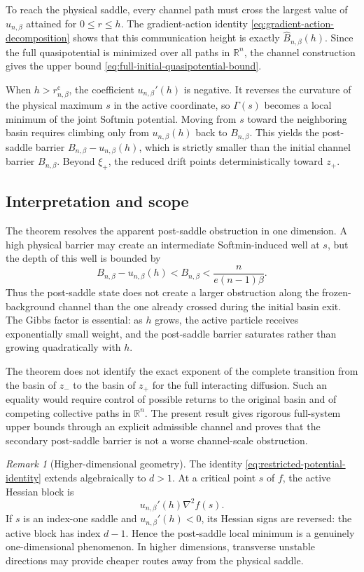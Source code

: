 \documentclass{article}
\theoremstyle{plain}
\theoremstyle{definition}
\theoremstyle{remark}
\newtheorem{remark}[theorem]{Remark}
\begin{document}
To reach the physical saddle, every channel path must cross the largest value of \(u_{n,\beta}\) attained for \(0\le r\le h\). The gradient-action identity \eqref{eq:gradient-action-decomposition} shows that this communication height is exactly
\(\widehat B_{n,\beta}(h)\). Since the full quasipotential is minimized over all paths in \(\mathbb R^n\), the channel construction gives the upper bound \eqref{eq:full-initial-quasipotential-bound}.

When \(h>r_{n,\beta}^{\mathrm c}\), the coefficient
\(u_{n,\beta}'(h)\) is negative. It reverses the curvature of the physical maximum \(s\) in the active coordinate, so \(\Gamma(s)\) becomes a local minimum of the joint Softmin potential. Moving from \(s\) toward the neighboring basin requires climbing only from
\(u_{n,\beta}(h)\) back to \(B_{n,\beta}\). This yields the post-saddle barrier
\(B_{n,\beta}-u_{n,\beta}(h)\), which is strictly smaller than the initial channel barrier \(B_{n,\beta}\). Beyond \(\xi_+\), the reduced drift points deterministically toward \(z_+\).

\subsection{Interpretation and scope}

The theorem resolves the apparent post-saddle obstruction in one dimension. A high physical barrier may create an intermediate Softmin-induced well at \(s\), but the depth of this well is bounded by
\[
    B_{n,\beta}-u_{n,\beta}(h)
    <
    B_{n,\beta}
    <
    \frac{n}{e(n-1)\beta}.
\]
Thus the post-saddle state does not create a larger obstruction along the frozen-background channel than the one already crossed during the initial basin exit. The Gibbs factor is essential: as \(h\) grows, the active particle receives exponentially small weight, and the post-saddle barrier saturates rather than growing quadratically with \(h\).

The theorem does not identify the exact exponent of the complete transition from the basin of \(z_-\) to the basin of \(z_+\) for the full interacting diffusion. Such an equality would require control of possible returns to the original basin and of competing collective paths in \(\mathbb R^n\). The present result gives rigorous full-system upper bounds through an explicit admissible channel and proves that the secondary post-saddle barrier is not a worse channel-scale obstruction.

\begin{remark}[Higher-dimensional geometry]
The identity \eqref{eq:restricted-potential-identity} extends algebraically to \(d>1\). At a critical point \(s\) of \(f\), the active Hessian block is
\[
    u_{n,\beta}'(h)\nabla^2f(s).
\]
If \(s\) is an index-one saddle and \(u_{n,\beta}'(h)<0\), its Hessian signs are reversed: the active block has index \(d-1\). Hence the post-saddle local minimum is a genuinely one-dimensional phenomenon. In higher dimensions, transverse unstable directions may provide cheaper routes away from the physical saddle.
\end{remark}
\end{document}
